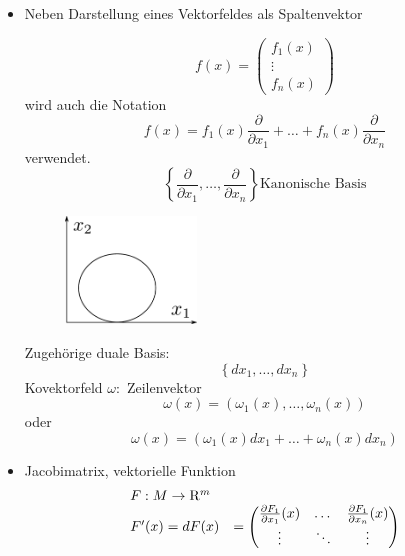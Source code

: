 \documentclass[ngerman]{tudscrreprt}
\begin{document}
\begin{itemize}
\item Neben Darstellung eines Vektorfeldes als Spaltenvektor 

\begin{equation*}
f(x) = \begin{pmatrix}
f_1(x)\\ \vdots\\ f_n(x)
\end{pmatrix}
\end{equation*} wird auch die Notation 
\begin{equation*}
f(x) = f_1(x) \frac{\partial}{\partial x_1} + \dots + f_n(x)\frac{\partial}{\partial x_n}
\end{equation*}
verwendet. \begin{equation*}
\left\{
\frac{\partial }{\partial x_1}, \dots , \frac{\partial }{\partial x_n}
\right\} \text{Kanonische Basis}
\end{equation*} 
\begin{figure}[H]
\centering
\def\svgwidth{200pt} 
  \includegraphics[width=3.5cm]{images/image17_1.pdf}
\end{figure}
Zugehörige duale Basis: \begin{equation*}
\left\{ 
dx_1,\dots, dx_n
\right\}
\end{equation*}
Kovektorfeld $\omega:$ Zeilenvektor \begin{equation*}
\omega (x) = (\omega_1 (x) , \dots,\omega_n(x) )
\end{equation*} 
oder 
\begin{equation*}
\omega (x) = (\omega_1 (x) dx_1 + \dots + \omega_n(x)dx_n )
\end{equation*} 
\item Jacobimatrix, vektorielle Funktion
\begin{equation*}
\begin{array}{l l }
F: M \to \mathrm{R}^m & \\ 
F'(x) = dF(x) & = 
\begin{pmatrix}
\frac{\partial F_1}{\partial x_1}(x) &\dots& \frac{\partial F_1}{\partial x_n}(x)\\ 
\vdots & \ddots & \vdots \\ 

\end{pmatrix}
\end{array}
\end{equation*}
\end{itemize}
\end{document}
